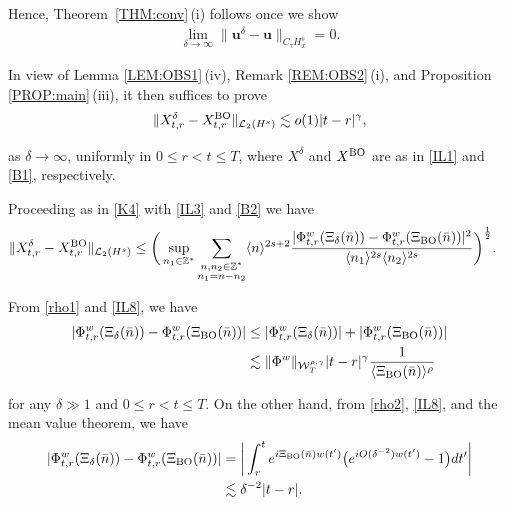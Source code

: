 \documentclass[letterpaper, 11pt,  reqno]{amsart}
\newcommand{\1}{\hspace{0.5mm}\text{I}\hspace{0.5mm}}
\newcommand{\noi}{\noindent}
\newcommand{\Z}{\mathbb{Z}}
\newcommand{\dl}{\delta}
\newcommand{\g}{\gamma}
\newcommand{\les}{\lesssim}
\newcommand{\jb}[1]
{\langle #1 \rangle}
\newcommand{\cL}{\mathcal{L}}
\newcommand{\W}{\mathcal{W}}
\newcommand{\uu}{\mathbf{u}}
\newcommand{\BO}{\text{\rm BO} }
\numberwithin{equation}{section}
\numberwithin{theorem}{section}
\begin{document}
Hence, 
Theorem~\ref{THM:conv}\,(i)
follows once we show
\begin{align}
\lim_{\dl \to \infty} \| \uu^\dl - \uu\|_{C_\tau H^s_x} = 0.
\label{ILD1b}
\end{align}

\noi
In view of 
Lemma \ref{LEM:OBS1}\,(iv), Remark \ref{REM:OBS2}\,(i), and 
Proposition \ref{PROP:main}\,(iii), 
it then suffices to prove 
\begin{align}
\|X^\dl_{t, r} - X^\BO_{t,r}\|_{\cL_2(H^s)}
\les 
o(1)|t-r|^{\g},
\label{ILD1}
\end{align}

\noi
as $\dl\to \infty$, 
uniformly in  $0 \le r < t \le T$, 
where $X^\dl$ and $X^\BO$
are as in 
\eqref{IL1} and 
\eqref{B1}, respectively.






Proceeding as in \eqref{K4} with \eqref{IL3} and \eqref{B2}
we have 
\begin{align}
\| X_{t, r}^\dl - X^\BO_{t,r} \|_{\cL_2 (H^s)}
&\leq  
\bigg(\sup_{n_1 \in \Z^*}
\sum_{\substack{n, n_2 \in \Z^*\\n_1 = n - n_2}} \jb{n}^{2s+2}
\frac{|\Phi^{w}_{t,r} (\Xi_\dl(\bar n))- \Phi^{w}_{t,r} (\Xi_\BO(\bar n)) |^2}{\jb{n_1}^{2s}\jb{n_2}^{2s}} \bigg)^\frac 12 .
\label{ILD2}
\end{align}


\noi
From 
 \eqref{rho1}  and \eqref{IL8}, we have 
\begin{align}
\begin{split}
|\Phi_{t,r}^w(\Xi_\dl (\bar n)) - \Phi_{t,r}^w(\Xi_\BO(\bar n) )|
& \le |\Phi_{t,r}^w(\Xi_\dl (\bar n))| +| \Phi_{t,r}^w(\Xi_\BO(\bar n) )|\\
& \les \|\Phi^w\|_{  \W^{\rho,\g}_T} 
|t - r|^\g
\frac 1{\jb{\Xi_\BO (\bar n)}^\rho}
\end{split}
\label{ILD3}
\end{align}

\noi
for any $\dl \gg1 $ and 
 $0 \le r < t \le T$.
On the other hand, 
from  \eqref{rho2},  \eqref{IL8}, 
and the mean value theorem, we have 
\begin{align}
\begin{aligned}
|\Phi_{t,r}^w(\Xi_\dl (\bar n)) - \Phi_{t,r}^w(\Xi_\BO(\bar n) )|
&=\bigg|
\int_r^t   e^{i \Xi_{\rm BO}  (\bar n)   w(t') } 
\big(e^{i  O(\dl^{-2})  w(t') }-1 \big)
 d t' \bigg|\\
& \les \dl^{-2}  |t- r|.
\end{aligned}
\label{ILD4}
\end{align}
\end{document}
